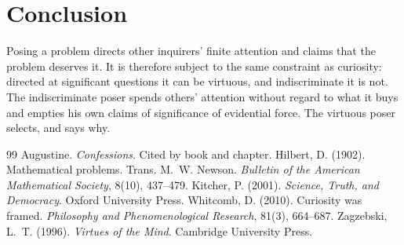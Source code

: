 \documentclass{situationist-preprint}
\begin{document}
\section{Conclusion}

Posing a problem directs other inquirers' finite attention and claims that the problem deserves it. It is therefore subject to the same constraint as curiosity: directed at significant questions it can be virtuous, and indiscriminate it is not. The indiscriminate poser spends others' attention without regard to what it buys and empties his own claims of significance of evidential force. The virtuous poser selects, and says why.

\begin{thebibliography}{99}\small
{} Augustine. \emph{Confessions}. Cited by book and chapter.
 Hilbert, D. (1902). Mathematical problems. Trans. M.~W. Newson. \emph{Bulletin of the American Mathematical Society}, 8(10), 437--479.
 Kitcher, P. (2001). \emph{Science, Truth, and Democracy}. Oxford University Press.
 Whitcomb, D. (2010). Curiosity was framed. \emph{Philosophy and Phenomenological Research}, 81(3), 664--687.
 Zagzebski, L.~T. (1996). \emph{Virtues of the Mind}. Cambridge University Press.
\end{thebibliography}
\end{document}
